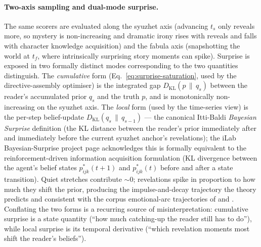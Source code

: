\documentclass[11pt]{article}
\begin{document}
\paragraph{Two-axis sampling and dual-mode surprise.} The same
scorers are evaluated along the syuzhet axis (advancing $t_s$
only reveals more, so mystery is non-increasing and dramatic
irony rises with reveals and falls with character knowledge
acquisition) and the fabula axis (snapshotting the world at
$t_f$, where intrinsically surprising story moments can spike).
Surprise is exposed in two formally distinct modes corresponding
to the two quantities \citet{ittibaldi2009surprise} distinguish.
The \emph{cumulative} form (Eq.~\ref{eq:surprise-saturation},
used by the directive-assembly optimiser) is the integrated gap
$D_{\mathrm{KL}}(p \,\|\, q_s)$ between the reader's accumulated
prior $q_s$ and the truth $p$, and is monotonically non-increasing
on the syuzhet axis. The \emph{local} form
(used by the time-series view) is the per-step belief-update
$D_{\mathrm{KL}}(q_s \,\|\, q_{s-1})$ --- the canonical Itti-Baldi
\emph{Bayesian Surprise} definition (the KL distance between the
reader's prior immediately after and immediately before the
current syuzhet anchor's revelations); the iLab Bayesian-Surprise
project page acknowledges this is formally equivalent to the
\citet{schmidhuber1995rdia} reinforcement-driven information
acquisition formulation (KL divergence between the agent's belief
states $p^*_{ijk}(t{+}1)$ and $p^*_{ijk}(t)$ before and after a
state transition). Quiet stretches contribute $\sim 0$;
revelations spike in proportion to how much they shift the prior,
producing the impulse-and-decay trajectory the theory predicts
and consistent with the corpus emotional-arc trajectories of
\citet{reagan2016arcs} and \citet{kim2017investigating}.
Conflating the two forms is a recurring source of
misinterpretation: cumulative surprise is a state quantity
(``how much catching-up the reader still has to do''), while
local surprise is its temporal derivative (``which revelation
moments most shift the reader's beliefs'').
\end{document}
